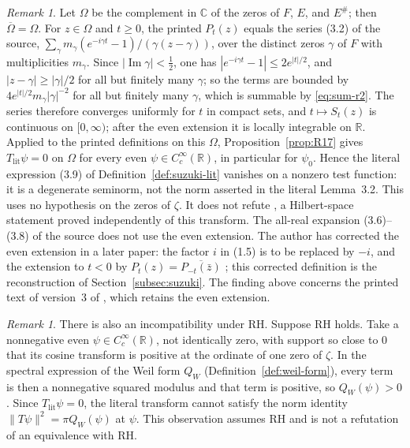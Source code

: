 \documentclass[11pt]{amsart}
\theoremstyle{plain}
\theoremstyle{definition}
\theoremstyle{remark}
\newtheorem{remark}[theorem]{Remark}
\numberwithin{equation}{section}
\newcommand{\C}{\mathbb{C}}
\newcommand{\R}{\mathbb{R}}
\DeclareMathOperator{\Ima}{Im}
\renewcommand{\Im}{\Ima}
\begin{document}
\begin{remark}\label{rem:R17-source}
Let $\Omega$ be the complement in $\C$ of the zeros of $F$, $E$, and
$E^\#$; then $\overline\Omega=\Omega$. For $z\in\Omega$ and $t\ge0$,
the printed $P_t(z)$ equals the series (3.2) of the source,
$\sum_\gamma m_\gamma(e^{-i\gamma t}-1)/(\gamma(z-\gamma))$, over the
distinct zeros $\gamma$ of $F$ with multiplicities $m_\gamma$. Since
$|\Im\gamma|<\tfrac12$, one has $|e^{-i\gamma t}-1|\le2e^{|t|/2}$, and
$|z-\gamma|\ge|\gamma|/2$ for all but finitely many $\gamma$; so the
terms are bounded by $4e^{|t|/2}m_\gamma|\gamma|^{-2}$ for all but
finitely many $\gamma$, which is summable by \eqref{eq:sum-r2}. The
series therefore converges uniformly for $t$ in compact sets, and
$t\mapsto S_t(z)$ is continuous on $[0,\infty)$; after the even
extension it is locally integrable on $\R$. Applied to the printed
definitions on this $\Omega$, Proposition~\ref{prop:R17} gives
$T_{\mathrm{lit}}\psi=0$ on $\Omega$ for every even
$\psi\in C_c^\infty(\R)$, in particular for $\psi_0$. Hence the literal
expression (3.9) of
Definition~\ref{def:suzuki-lit} vanishes on a nonzero test function: it
is a degenerate seminorm, not the norm asserted in the literal
Lemma~3.2. This uses no hypothesis on the zeros of $\zeta$. It does not
refute \cite[Theorem~1.1]{Suzuki2023WeilHilbert}, a Hilbert-space
statement proved independently of this transform. The all-real
expansion (3.6)--(3.8) of the source does not use the even extension.
The author has corrected the even extension in a later paper: the
factor $i$ in (1.5) is to be replaced by $-i$, and the extension to
$t<0$ by $P_t(z)=\overline{P_{-t}(\bar z)}$
\cite[p.~27]{Suzuki2026WeilScrew}; this corrected definition is the
reconstruction of Section~\ref{subsec:suzuki}. The finding above
concerns the printed text of version~3 of \cite{Suzuki2023WeilHilbert},
which retains the even extension.
\end{remark}

\begin{remark}\label{rem:R17-rh}
There is also an incompatibility under RH. Suppose RH holds. Take a
nonnegative even $\psi\in C_c^\infty(\R)$, not identically zero, with
support so close to $0$ that its cosine transform is positive at the
ordinate of one zero of $\zeta$. In the spectral expression of the Weil
form $Q_W$ (Definition~\ref{def:weil-form}), every term is then a
nonnegative squared modulus and that term is positive, so
$Q_W(\psi)>0$. Since $T_{\mathrm{lit}}\psi=0$, the literal transform
cannot satisfy the norm identity $\|T\psi\|^2=\pi Q_W(\psi)$ at $\psi$.
This observation assumes RH and is not a refutation of an equivalence
with RH.
\end{remark}
\end{document}

